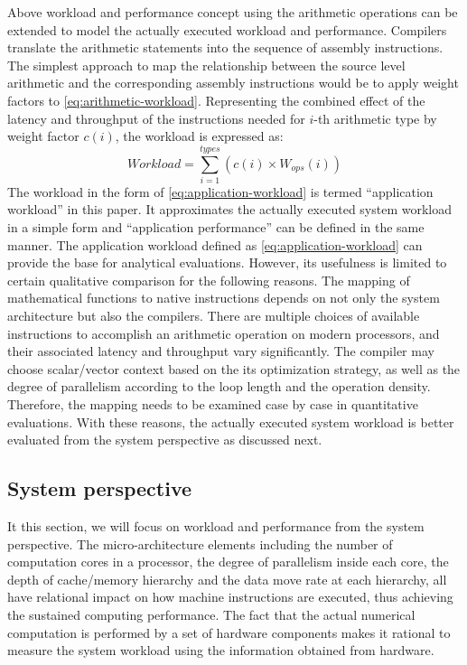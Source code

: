 \documentclass[conference]{IEEEtran}
\begin{document}
Above workload and performance concept using the arithmetic operations
can be extended to model the actually executed workload and performance.
Compilers translate the arithmetic statements into the sequence of
assembly instructions.
The simplest approach to map the relationship between
the source level arithmetic and the corresponding assembly instructions
would be to apply weight factors  to \eqref{eq:arithmetic-workload}.
%
Representing the combined effect of the latency and throughput of the
instructions needed for $ i $-th arithmetic type
by weight factor $ c(i) $, the workload is expressed as:
%
\begin{equation}\label{eq:application-workload}
		Workload = \sum_{i=1}^{types} \left(c(i)\times W_{ops}(i)\right)
\end{equation}
%
The workload in the form of \eqref{eq:application-workload}
is termed ``application workload'' in this paper.
It approximates the actually executed system workload in a simple form
and ``application performance'' can be defined in the same manner.
%
%
The application workload defined as \eqref{eq:application-workload}
can provide the base for analytical evaluations.
However, its usefulness is limited to certain qualitative comparison
for the following reasons.
The mapping of mathematical functions to native instructions 
depends on not only the system architecture but also the compilers.
There are multiple choices of available instructions to accomplish an
arithmetic operation on modern processors, and their associated latency
and throughput vary significantly.
The compiler may choose scalar/vector context based on
the its optimization strategy, as well as the degree of parallelism
according to the loop length and the operation density.
Therefore, the mapping needs to be examined case by case
in quantitative evaluations.
With these reasons, the actually executed system workload is better evaluated
from the system perspective as discussed next.

%
\subsection{System perspective}
\label{subsection:system-perspective}

It this section, we will focus on workload and performance from
the system perspective.
The micro-architecture elements including the number of computation cores
in a processor, the degree of parallelism inside each core,
the depth of cache/memory hierarchy and the data move rate at each hierarchy,
all have relational impact on how machine instructions are executed,
thus achieving the sustained computing performance.
The fact that the actual numerical computation is performed by
a set of hardware components makes it rational to measure
the system workload using the information obtained from hardware.
\end{document}
